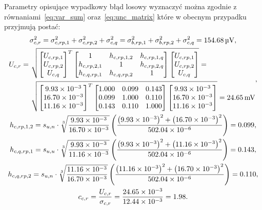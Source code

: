 Parametry opisujące wypadkowy błąd losowy wyznaczyć można zgodnie z równaniami~\eqref{eq:var_sum} oraz~\eqref{eq:unc_matrix} które w obecnym przypadku przyjmują postać:
\begin{gather}
\sigma_{c,r}^{2} = \sigma_{c,rp,1}^{2} + \sigma_{c,rp,2}^{2} + \sigma_{c,q}^{2} = \sigma_{b,rp,1}^{2} + \sigma_{b,rp,2}^{2} + \sigma_{c,q}^{2} = \qty{154.68}{\micro V} \label{eq:sym_partc_rand_var}, \\
\begin{split}
U_{c,r} = ~ & \sqrt{
\begin{bmatrix}
U_{c,rp,1} \\ U_{c,rp,2} \\ U_{c,q}
\end{bmatrix}^{T}
\begin{bmatrix}
1            & h_{c,rp,1,2} & h_{c,rp,1,q} \\
h_{c,rp,2,1} & 1            & h_{c,rp,2,q} \\
h_{c,q,rp,1} & h_{c,q,rp,2} & 1
\end{bmatrix}
\begin{bmatrix}
U_{c,rp,1} \\ U_{c,rp,2} \\ U_{c,q}
\end{bmatrix}} = ~ \\ & \sqrt{
\begin{bmatrix}
\num{9.93e-3} \\ \num{16.70e-3} \\ \num{11.16e-3}
\end{bmatrix}^{T}
\begin{bmatrix}
1.000 & 0.099 & 0.143 \\
0.099 & 1.000 & 0.110 \\
0.143 & 0.110 & 1.000
\end{bmatrix}
\begin{bmatrix}
\num{9.93e-3} \\ \num{16.70e-3} \\ \num{11.16e-3}
\end{bmatrix}} = \qty{24.65}{mV}
\end{split}
\label{eq:sym_partc_rand_uncert}, \\
h_{c,rp,1,2} = s_{u,n} \cdot \sqrt[3]{\frac{\num{9.93e-3}}{\num{16.70e-3}}} \left( \frac{\left(\num{9.93e-3}\right)^{2} + \left(\num{16.70e-3}\right)^{2}}{\num{502.04e-6}} \right) = 0.099 \label{eq:sym_partc_coher_rp_1_2}, \\
h_{c,q,rp,1} = s_{u,u} \cdot \sqrt[3]{\frac{\num{9.93e-3}}{\num{11.16e-3}}} \left( \frac{\left(\num{9.93e-3}\right)^{2} + \left(\num{11.16e-3}\right)^{2}}{\num{502.04e-6}} \right) = 0.143 \label{eq:sym_partc_coher_q_rp_1}, \\
h_{c,q,rp,2} = s_{u,n} \cdot \sqrt[3]{\frac{\num{11.16e-3}}{\num{16.70e-3}}} \left( \frac{\left(\num{11.16e-3}\right)^{2} + \left(\num{16.70e-3}\right)^{2}}{\num{502.04e-6}} \right) = 0.110 \label{eq:sym_partc_coher_q_rp_1}, \\
c_{c,r} = \frac{U_{c,r}}{\sigma_{c,r}} = \frac{\num{24.65e-3}}{\num{12.44e-3}} = 1.98 \label{eq:sym_partc_rand_factor}.
\end{gather}

